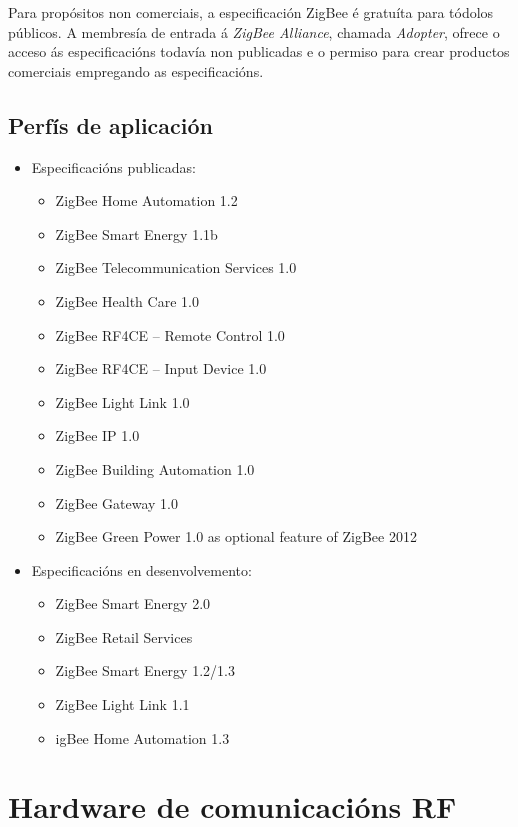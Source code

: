  Para propósitos non comerciais, a especificación ZigBee é gratuíta para
 tódolos públicos. A membresía de entrada á \textit{ZigBee Alliance}, chamada
 \textit{Adopter}, ofrece o acceso ás especificacións todavía non publicadas e
 o permiso para crear productos comerciais empregando as especificacións. \\

 \subsection{Perfís de aplicación}

 \begin{itemize}
  \item Especificacións publicadas:
        \begin{itemize}
         \item ZigBee Home Automation 1.2
         \item ZigBee Smart Energy 1.1b
         \item ZigBee Telecommunication Services 1.0
         \item ZigBee Health Care 1.0
         \item ZigBee RF4CE – Remote Control 1.0
         \item ZigBee RF4CE – Input Device 1.0
         \item ZigBee Light Link 1.0
         \item ZigBee IP 1.0
         \item ZigBee Building Automation 1.0
         \item ZigBee Gateway 1.0
         \item ZigBee Green Power 1.0 as optional feature of ZigBee 2012
        \end{itemize}
  \item Especificacións en desenvolvemento:
        \begin{itemize}
         \item ZigBee Smart Energy 2.0
         \item ZigBee Retail Services
         \item ZigBee Smart Energy 1.2/1.3
         \item ZigBee Light Link 1.1
         \item igBee Home Automation 1.3
        \end{itemize}
 \end{itemize}

\section{Hardware de comunicacións RF}

